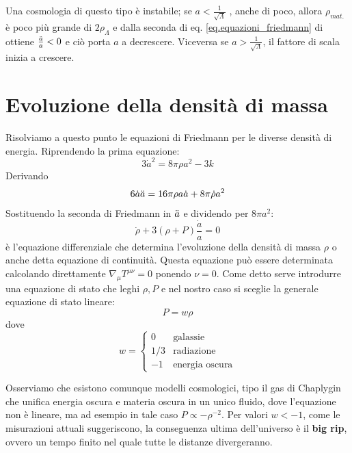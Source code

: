 Una cosmologia di questo tipo è instabile; se $a < \frac{1}{\sqrt{\Lambda}}$ , anche di poco, allora $\rho_{mat.}$ è poco più grande di $2\rho_\Lambda$ e dalla seconda di eq. \ref{eq.equazioni_friedmann} di ottiene $\frac{\Ddot{a}}{a} < 0 $ e ciò porta $a$ a decrescere. Viceversa se $a > \frac{1}{\sqrt{\Lambda}}$, il fattore di scala inizia a crescere.
\section{Evoluzione della densità di massa}
Risolviamo a questo punto le equazioni di Friedmann per le diverse densità di energia. Riprendendo la prima equazione:
\begin{equation*}
    3\dot{a}^2 = 8\pi \rho a^2 -3k
\end{equation*}
Derivando
\begin{equation*}
    6\dot{a}\Ddot{a} = 16\pi \rho a \dot{a} + 8\pi \dot{\rho} a^2
\end{equation*}
Sostituendo la seconda di Friedmann in $\Ddot{a}$ e dividendo per $8\pi a^2$:
\begin{equation}
    \dot{\rho} + 3(\rho + P) \frac{\dot{a}}{a} = 0
    \label{eq.continuità_cosmologia}
\end{equation}
è l'equazione differenziale che determina l'evoluzione della densità di massa $\rho$ o anche detta equazione di continuità. Questa equazione può essere determinata calcolando direttamente $\nabla_\mu T^{\mu\nu} = 0$ ponendo $\nu = 0$. Come detto serve introdurre una equazione di stato che leghi $\rho, P$ e nel nostro caso si sceglie la generale equazione di stato lineare:
\begin{equation*}
    P = w \rho
\end{equation*}
dove
\begin{equation*}
    w = \left\{ \begin{array}{ll}
        0 & \textrm{galassie} \\
        1/3 & \textrm{radiazione} \\
        -1 & \textrm{energia oscura}
    \end{array}\right.
\end{equation*}

Osserviamo che esistono comunque modelli cosmologici, tipo il gas di Chaplygin che unifica energia oscura e materia oscura in un unico fluido, dove l'equazione non è lineare, ma ad esempio in tale caso $P \propto - \rho^{-2}$. Per valori $w < -1$, come le misurazioni attuali suggeriscono, la conseguenza ultima dell'universo è il \textbf{big rip}, ovvero un tempo finito nel quale tutte le distanze divergeranno.

